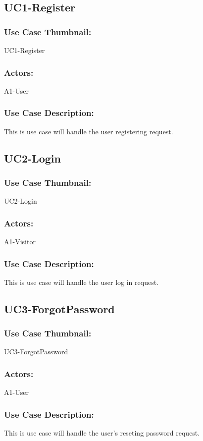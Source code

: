 \documentclass[11pt, openany]{report}
\begin{document}
\subsection{UC1-Register}
\label{sUC1}
\subsubsection*{Use Case Thumbnail:}
UC1-Register
\subsubsection*{Actors:}
A1-User
\subsubsection*{Use Case Description:}
This is use case will handle the user registering request.

\subsection{UC2-Login}
\label{sUC2}
\subsubsection*{Use Case Thumbnail:}
UC2-Login
\subsubsection*{Actors:}
A1-Visitor
\subsubsection*{Use Case Description:}
This is use case will handle the user log in request.

\subsection{UC3-ForgotPassword}
\label{sUC3}
\subsubsection*{Use Case Thumbnail:}
UC3-ForgotPassword
\subsubsection*{Actors:}
A1-User
\subsubsection*{Use Case Description:}
This is use case will handle the user's reseting password request. \\
\end{document}
